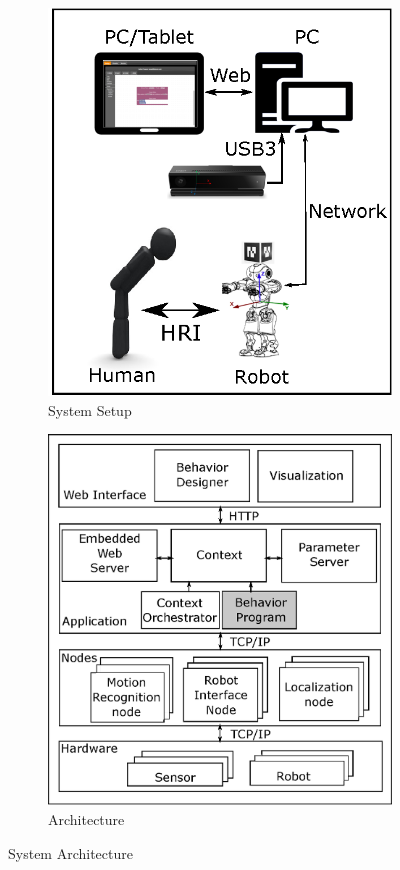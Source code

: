 \documentclass{llncs}
\begin{document}
\begin{figure}
\centering
\begin{subfigure}[t]{0.48\textwidth}
\includegraphics[width=\textwidth]{../thesis/assets/system_setup.eps}
\caption[System Setup]{System Setup}
\end{subfigure}
\begin{subfigure}[t]{0.48\textwidth}
\includegraphics[width=\textwidth]{../thesis/assets/architecture.eps}
\caption[System Architecture]{Architecture}
\end{subfigure}
\caption[System Architecture]{System Architecture}
\label{fig:architecture}
\end{figure}
\end{document}
